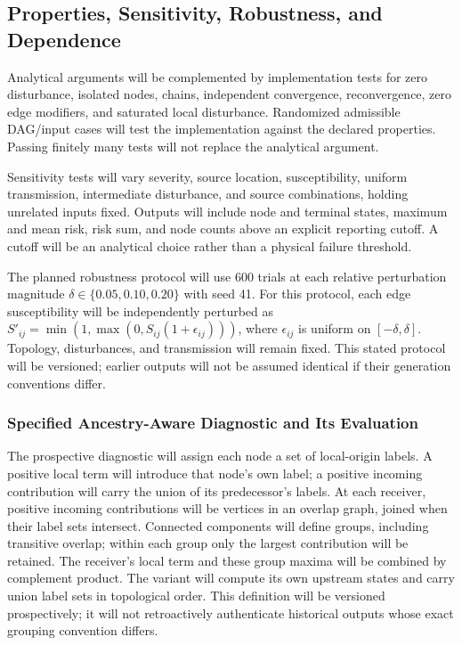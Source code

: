 

\subsection{Properties, Sensitivity, Robustness, and Dependence}
\label{behavioral-evaluation}

Analytical arguments will be complemented by implementation tests for
zero disturbance, isolated nodes, chains, independent convergence,
reconvergence, zero edge modifiers, and saturated local disturbance.
Randomized admissible DAG/input cases will test the implementation against
the declared properties. Passing finitely many tests will not replace
the analytical argument.

Sensitivity tests will vary severity, source location, susceptibility,
uniform transmission, intermediate disturbance, and source combinations,
holding unrelated inputs fixed. Outputs will include node and terminal
states, maximum and mean risk, risk sum, and node counts above an
explicit reporting cutoff. A cutoff will be an analytical choice rather
than a physical failure threshold.

The planned robustness protocol will use 600 trials at each relative
perturbation magnitude $\delta\in\{0.05,0.10,0.20\}$ with seed 41.
For this protocol, each edge susceptibility will be independently perturbed
as $S'_{ij}=\min(1,\max(0,S_{ij}(1+\epsilon_{ij})))$,
where $\epsilon_{ij}$ is uniform on $[-\delta,\delta]$.
Topology, disturbances, and transmission will remain fixed.
This stated protocol will be versioned; earlier outputs will not be
assumed identical if their generation conventions differ.

\subsubsection{Specified Ancestry-Aware Diagnostic and Its Evaluation}
\label{ancestry-diagnostic}

The prospective diagnostic will assign each node a set of local-origin labels.
A positive local term will introduce that node's own label; a positive incoming
contribution will carry the union of its predecessor's labels. At each receiver,
positive incoming contributions will be vertices in an overlap graph, joined
when their label sets intersect. Connected components will define groups,
including transitive overlap; within each group only the largest contribution
will be retained. The receiver's local term and these group maxima will be
combined by complement product. The variant will compute its own upstream
states and carry union label sets in topological order. This definition will
be versioned prospectively; it will not retroactively authenticate historical
outputs whose exact grouping convention differs.

